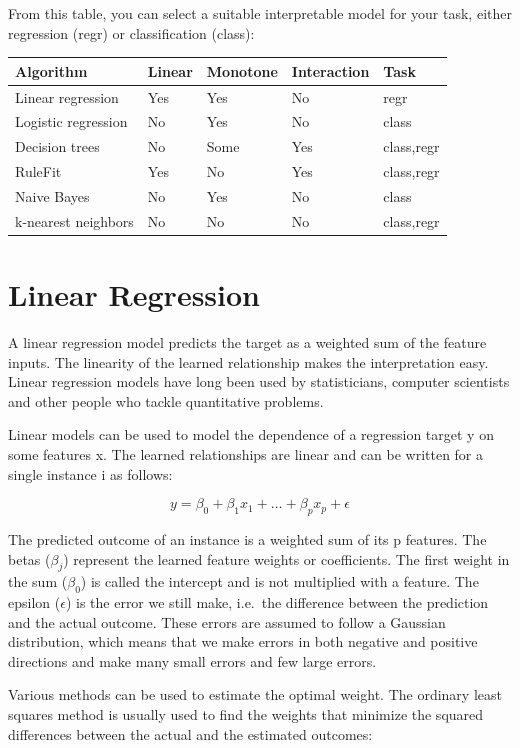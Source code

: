 \documentclass[12pt,]{krantz}
\begin{document}
From this table, you can select a suitable interpretable model for your
task, either regression (regr) or classification (class):

\begin{longtable}[]{@{}lllll@{}}
\toprule
Algorithm & Linear & Monotone & Interaction & Task\tabularnewline
\midrule
\endhead
Linear regression & Yes & Yes & No & regr\tabularnewline
Logistic regression & No & Yes & No & class\tabularnewline
Decision trees & No & Some & Yes & class,regr\tabularnewline
RuleFit & Yes & No & Yes & class,regr\tabularnewline
Naive Bayes & No & Yes & No & class\tabularnewline
k-nearest neighbors & No & No & No & class,regr\tabularnewline
\bottomrule
\end{longtable}

\newpage

\hypertarget{limo}{\section{Linear Regression}\label{limo}}

A linear regression model predicts the target as a weighted sum of the
feature inputs. The linearity of the learned relationship makes the
interpretation easy. Linear regression models have long been used by
statisticians, computer scientists and other people who tackle
quantitative problems.

Linear models can be used to model the dependence of a regression target
y on some features x. The learned relationships are linear and can be
written for a single instance i as follows:

\[y=\beta_{0}+\beta_{1}x_{1}+\ldots+\beta_{p}x_{p}+\epsilon\]

The predicted outcome of an instance is a weighted sum of its p
features. The betas (\(\beta_{j}\)) represent the learned feature
weights or coefficients. The first weight in the sum (\(\beta_0\)) is
called the intercept and is not multiplied with a feature. The epsilon
(\(\epsilon\)) is the error we still make, i.e.~the difference between
the prediction and the actual outcome. These errors are assumed to
follow a Gaussian distribution, which means that we make errors in both
negative and positive directions and make many small errors and few
large errors.

Various methods can be used to estimate the optimal weight. The ordinary
least squares method is usually used to find the weights that minimize
the squared differences between the actual and the estimated outcomes:
\end{document}
